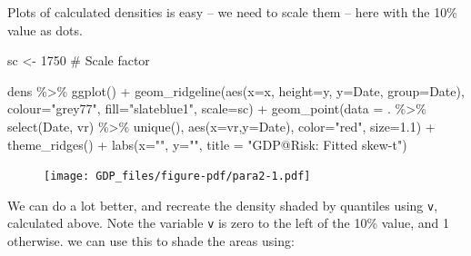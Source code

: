 \documentclass[
  letterpaper,
]{book}
\newenvironment{Shaded}{\begin{snugshade}}{\end{snugshade}}
\newcommand{\AttributeTok}[1]{\textcolor[rgb]{0.40,0.45,0.13}{#1}}
\newcommand{\CommentTok}[1]{\textcolor[rgb]{0.37,0.37,0.37}{#1}}
\newcommand{\DecValTok}[1]{\textcolor[rgb]{0.68,0.00,0.00}{#1}}
\newcommand{\FloatTok}[1]{\textcolor[rgb]{0.68,0.00,0.00}{#1}}
\newcommand{\FunctionTok}[1]{\textcolor[rgb]{0.28,0.35,0.67}{#1}}
\newcommand{\NormalTok}[1]{\textcolor[rgb]{0.00,0.23,0.31}{#1}}
\newcommand{\OtherTok}[1]{\textcolor[rgb]{0.00,0.23,0.31}{#1}}
\newcommand{\SpecialCharTok}[1]{\textcolor[rgb]{0.37,0.37,0.37}{#1}}
\newcommand{\StringTok}[1]{\textcolor[rgb]{0.13,0.47,0.30}{#1}}
\begin{document}
Plots of calculated densities is easy -- we need to scale them -- here
with the 10\% value as dots.

\begin{Shaded}
\begin{Highlighting}[]
\NormalTok{sc   }\OtherTok{\textless{}{-}} \DecValTok{1750}                                    \CommentTok{\# Scale factor}

\NormalTok{dens }\SpecialCharTok{\%\textgreater{}\%} 
  \FunctionTok{ggplot}\NormalTok{() }\SpecialCharTok{+} 
  \FunctionTok{geom\_ridgeline}\NormalTok{(}\FunctionTok{aes}\NormalTok{(}\AttributeTok{x=}\NormalTok{x, }\AttributeTok{height=}\NormalTok{y, }\AttributeTok{y=}\NormalTok{Date, }\AttributeTok{group=}\NormalTok{Date), }\AttributeTok{colour=}\StringTok{"grey77"}\NormalTok{, }\AttributeTok{fill=}\StringTok{"slateblue1"}\NormalTok{, }\AttributeTok{scale=}\NormalTok{sc) }\SpecialCharTok{+}
  \FunctionTok{geom\_point}\NormalTok{(}\AttributeTok{data =}\NormalTok{ . }\SpecialCharTok{\%\textgreater{}\%} \FunctionTok{select}\NormalTok{(Date, vr) }\SpecialCharTok{\%\textgreater{}\%} \FunctionTok{unique}\NormalTok{(), }\FunctionTok{aes}\NormalTok{(}\AttributeTok{x=}\NormalTok{vr,}\AttributeTok{y=}\NormalTok{Date), }\AttributeTok{color=}\StringTok{"red"}\NormalTok{, }\AttributeTok{size=}\FloatTok{1.1}\NormalTok{) }\SpecialCharTok{+} 
  \FunctionTok{theme\_ridges}\NormalTok{() }\SpecialCharTok{+} 
  \FunctionTok{labs}\NormalTok{(}\AttributeTok{x=}\StringTok{""}\NormalTok{, }\AttributeTok{y=}\StringTok{""}\NormalTok{, }\AttributeTok{title =} \StringTok{"GDP@Risk: Fitted skew{-}t"}\NormalTok{)}
\end{Highlighting}
\end{Shaded}

\begin{figure}[H]

{\centering \texttt{[image: GDP\_files/figure-pdf/para2-1.pdf]}

}

\end{figure}

We can do a lot better, and recreate the density shaded by quantiles
using \texttt{v}, calculated above. Note the variable \texttt{v} is zero
to the left of the 10\% value, and 1 otherwise. we can use this to shade
the areas using:
\end{document}
